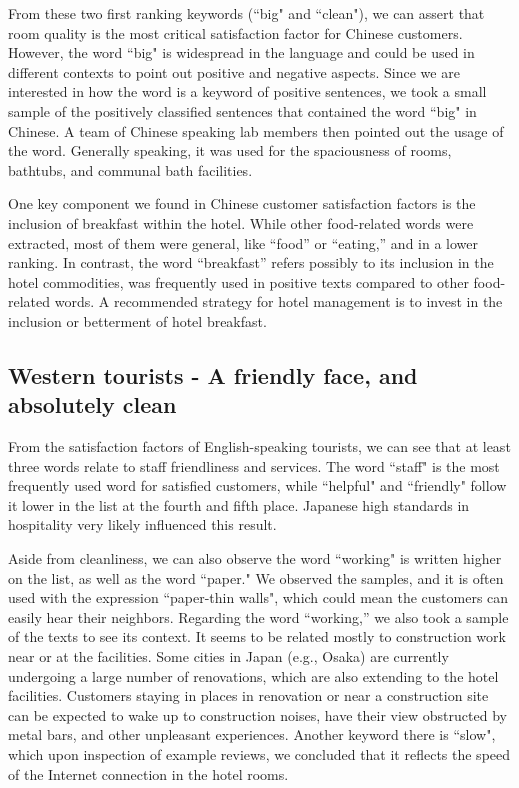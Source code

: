 \documentclass[smallextended,natbib]{svjour3}       %
\begin{document}
From these two first ranking keywords (``big" and ``clean"), we can assert that room quality is the most critical satisfaction factor for Chinese customers. However, the word ``big" is widespread in the language and could be used in different contexts to point out positive and negative aspects. Since we are interested in how the word is a keyword of positive sentences, we took a small sample of the positively classified sentences that contained the word ``big" in Chinese. A team of Chinese speaking lab members then pointed out the usage of the word. Generally speaking, it was used for the spaciousness of rooms, bathtubs, and communal bath facilities. 

One key component we found in Chinese customer satisfaction factors is the inclusion of breakfast within the hotel. While other food-related words were extracted, most of them were general, like “food” or “eating,” and in a lower ranking. In contrast, the word “breakfast” refers possibly to its inclusion in the hotel commodities, was frequently used in positive texts compared to other food-related words. A recommended strategy for hotel management is to invest in the inclusion or betterment of hotel breakfast. 

\subsection{Western tourists - A friendly face, and absolutely clean}\label{disc:en}

From the satisfaction factors of English-speaking tourists, we can see that at least three words relate to staff friendliness and services. The word ``staff" is the most frequently used word for satisfied customers, while ``helpful" and ``friendly" follow it lower in the list at the fourth and fifth place. Japanese high standards in hospitality very likely influenced this result.

Aside from cleanliness, we can also observe the word ``working" is written higher on the list, as well as the word ``paper." We observed the samples, and it is often used with the expression ``paper-thin walls", which could mean the customers can easily hear their neighbors. Regarding the word ``working,'' we also took a sample of the texts to see its context. It seems to be related mostly to construction work near or at the facilities. Some cities in Japan (e.g., Osaka) are currently undergoing a large number of renovations, which are also extending to the hotel facilities. Customers staying in places in renovation or near a construction site can be expected to wake up to construction noises, have their view obstructed by metal bars, and other unpleasant experiences. Another keyword there is ``slow", which upon inspection of example reviews, we concluded that it reflects the speed of the Internet connection in the hotel rooms.
\end{document}
